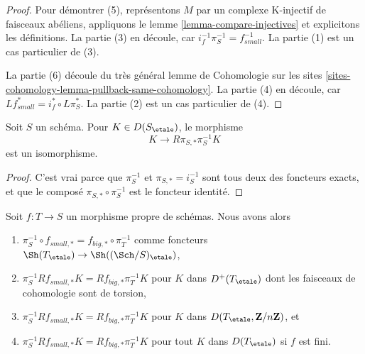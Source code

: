 \begin{proof}
Pour démontrer (5), représentons $M$ par un complexe K-injectif de faisceaux abéliens,
appliquons le lemme \ref{lemma-compare-injectives}
et explicitons les définitions. La partie (3) en découle,
car $i_f^{-1}\pi_S^{-1} = f_{small}^{-1}$. La partie (1) est un cas
particulier de (3).

\medskip\noindent
La partie (6) découle du très général lemme de Cohomologie sur les sites
\ref{sites-cohomology-lemma-pullback-same-cohomology}. La partie
(4) en découle, car $Lf_{small}^* = i_f^* \circ L\pi_S^*$.
La partie (2) est un cas particulier de (4).
\end{proof}

\begin{lemma}
\label{lemma-cohomological-descent-etale}
Soit $S$ un schéma. Pour $K \in D(S_\etale)$, le morphisme
$$
K \longrightarrow R\pi_{S, *}\pi_S^{-1}K
$$
est un isomorphisme.
\end{lemma}

\begin{proof}
C'est vrai parce que $\pi_S^{-1}$ et $\pi_{S, *} = i_S^{-1}$
sont tous deux des foncteurs exacts, et que le composé $\pi_{S, *} \circ \pi_S^{-1}$
est le foncteur identité.
\end{proof}

\begin{lemma}
\label{lemma-compare-higher-direct-image-proper}
Soit $f : T \to S$ un morphisme propre de schémas. Nous avons alors
\begin{enumerate}
\item $\pi_S^{-1} \circ f_{small, *} = f_{big, *} \circ \pi_T^{-1}$
comme foncteurs $\Sh(T_\etale) \to \Sh((\Sch/S)_\etale)$,
\item $\pi_S^{-1}Rf_{small, *}K = Rf_{big, *}\pi_T^{-1}K$
pour $K$ dans $D^+(T_\etale)$ dont les faisceaux de cohomologie sont de torsion,
\item $\pi_S^{-1}Rf_{small, *}K = Rf_{big, *}\pi_T^{-1}K$
pour $K$ dans $D(T_\etale, \mathbf{Z}/n\mathbf{Z})$, et
\item $\pi_S^{-1}Rf_{small, *}K = Rf_{big, *}\pi_T^{-1}K$
pour tout $K$ dans $D(T_\etale)$ si $f$ est fini.
\end{enumerate}
\end{lemma}

